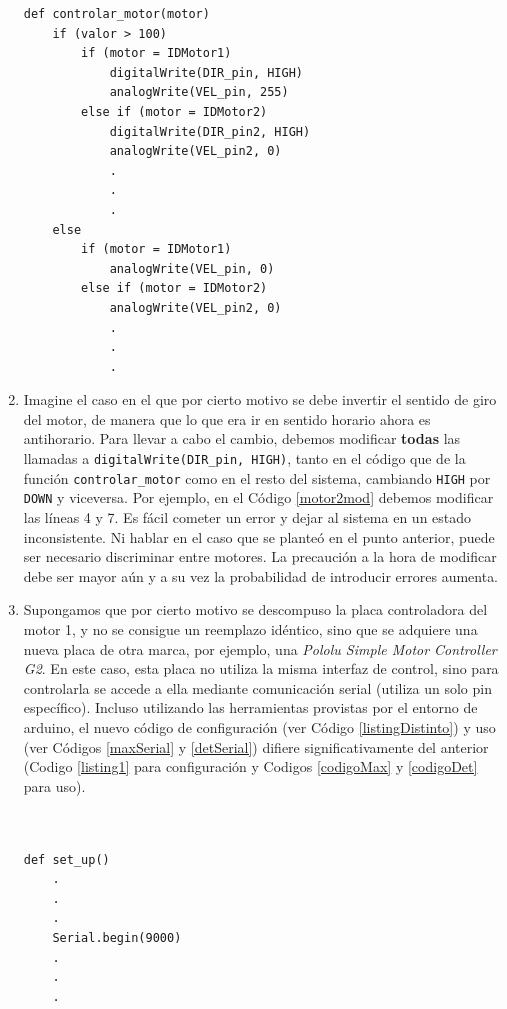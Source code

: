 \begin{enumerate}
\begin{lstlisting}[caption=Modificación de la función controlar\_motor para cambiar su comportamiento al utilizar el motor 2.,label={motor2mod}]
def controlar_motor(motor)
    if (valor > 100)
        if (motor = IDMotor1)
            digitalWrite(DIR_pin, HIGH)
            analogWrite(VEL_pin, 255)
        else if (motor = IDMotor2)
            digitalWrite(DIR_pin2, HIGH)
            analogWrite(VEL_pin2, 0)
            .
            .
            .
    else
        if (motor = IDMotor1)
            analogWrite(VEL_pin, 0)
        else if (motor = IDMotor2)
            analogWrite(VEL_pin2, 0)
            .
            .
            .

\end{lstlisting}
	\item Imagine el caso en el que por cierto motivo se debe invertir el sentido de giro del motor, de manera que lo que era ir en sentido horario ahora es antihorario. Para llevar a cabo el cambio, debemos modificar \textbf{todas} las llamadas a \verb|digitalWrite(DIR_pin, HIGH)|, tanto en el código que de la función \verb|controlar_motor| como en el resto del sistema, cambiando \verb|HIGH| por \verb|DOWN| y viceversa. Por ejemplo, en el Código \ref{motor2mod} debemos modificar las líneas 4 y 7. Es fácil cometer un error y dejar al sistema en un estado inconsistente. Ni hablar en el caso que se planteó en el punto anterior, puede ser necesario discriminar entre motores. La precaución a la hora de modificar debe ser mayor aún y a su vez la probabilidad de introducir errores aumenta. \label{itemSentidogiro}
   
    \item Supongamos que por cierto motivo se descompuso la placa controladora del motor 1, y no se consigue un reemplazo idéntico, sino que se adquiere una nueva placa de otra marca, por ejemplo, una \textit{Pololu Simple Motor Controller G2}. En este caso, esta placa no utiliza la misma interfaz de control, sino para controlarla se accede a ella mediante comunicación serial (utiliza un solo pin específico). Incluso utilizando las herramientas provistas por el entorno de \gls{arduino}, el nuevo código de configuración (ver Código \ref{listingDistinto}) y uso (ver Códigos \ref{maxSerial} y \ref{detSerial}) difiere significativamente del anterior (Codigo \ref{listing1} para configuración y Codigos \ref{codigoMax} y \ref{codigoDet} para uso).
\\\\\\
\begin{lstlisting}[caption=Configuración de la placa de control del motor DC utiliza comunicación serie., label={listingDistinto}]
def set_up() 
    .
    .
    .
    Serial.begin(9000)
    .
    .
    .


\end{lstlisting}
\end{enumerate}
